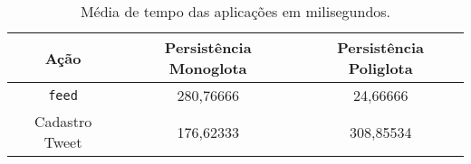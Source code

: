 \begin{table}[H]
    \centering
    \caption[Média de tempo das aplicações em milisegundos]{Média de tempo das aplicações em milisegundos.\label{tab:tempo}}
    \begin{tabular}{ccc}
        \hline
            Ação & Persistência Monoglota & Persistência Poliglota\\
        \hline
            \verb|feed| & 280,76666 & 24,66666 \\
            Cadastro Tweet & 176,62333 & 308,85534 \\
        \hline
    \end{tabular}
\end{table}
